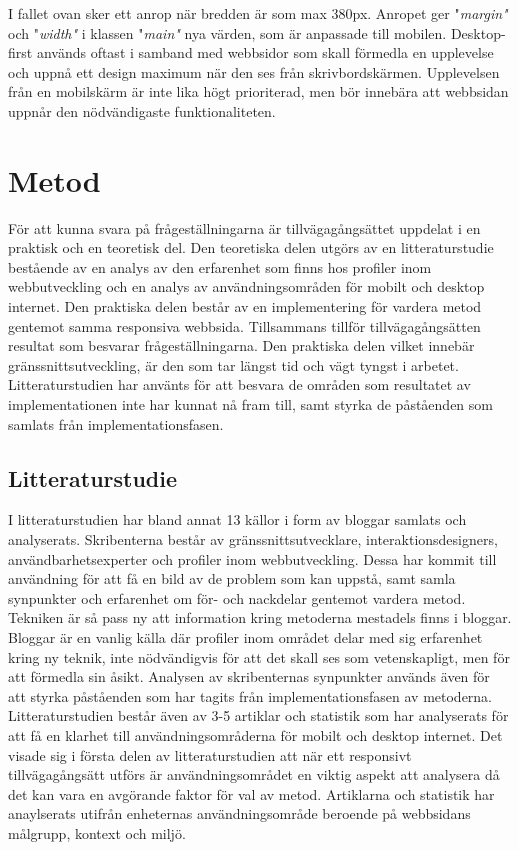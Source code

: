 \documentclass[11pt]{article}
\begin{document}
I fallet ovan sker ett anrop när bredden är som max 380px. Anropet ger "\textit{margin"} och "\textit{width"} i klassen "\textit{main"} nya värden, som är anpassade till mobilen. Desktop-first används oftast i samband med webbsidor som skall förmedla en upplevelse och uppnå ett design maximum när den ses från skrivbordskärmen. Upplevelsen från en mobilskärm är inte lika högt prioriterad, men bör innebära att webbsidan uppnår den nödvändigaste funktionaliteten.
\newpage

\section{Metod}
För att kunna svara på frågeställningarna är tillvägagångsättet uppdelat i en praktisk och en teoretisk del. Den teoretiska delen utgörs av en litteraturstudie bestående av en analys av den erfarenhet som finns hos profiler inom webbutveckling och en analys av användningsområden för mobilt och desktop internet. Den praktiska delen består av en implementering för vardera metod gentemot samma responsiva webbsida. Tillsammans tillför tillvägagångsätten resultat som besvarar frågeställningarna. Den praktiska delen vilket innebär gränssnittsutveckling, är den som tar längst tid och vägt tyngst i arbetet. Litteraturstudien har använts för att besvara de områden som resultatet av implementationen inte har kunnat nå fram till, samt styrka de påståenden som samlats från implementationsfasen.

\subsection{Litteraturstudie}
I litteraturstudien har bland annat 13 källor i form av bloggar samlats och analyserats. Skribenterna består av gränssnittsutvecklare, interaktionsdesigners, användbarhetsexperter och profiler inom webbutveckling. Dessa har kommit till användning för att få en bild av de problem som kan uppstå, samt samla synpunkter och erfarenhet om för- och nackdelar gentemot vardera metod. Tekniken är så pass ny att information kring metoderna mestadels finns i bloggar. Bloggar är en vanlig källa där profiler inom området delar med sig erfarenhet kring ny teknik, inte nödvändigvis för att det skall ses som vetenskapligt, men för att förmedla sin åsikt. Analysen av skribenternas synpunkter används även för att styrka påståenden som har tagits från implementationsfasen av metoderna. Litteraturstudien består även av 3-5 artiklar och statistik som har analyserats för att få en klarhet till användningsområderna för mobilt och desktop internet. Det visade sig i första delen av litteraturstudien att när ett responsivt tillvägagångsätt utförs är användningsområdet en viktig aspekt att analysera då det kan vara en avgörande faktor för val av metod. Artiklarna och statistik har anaylserats utifrån enheternas användningsområde beroende på webbsidans målgrupp, kontext och miljö.
\end{document}
